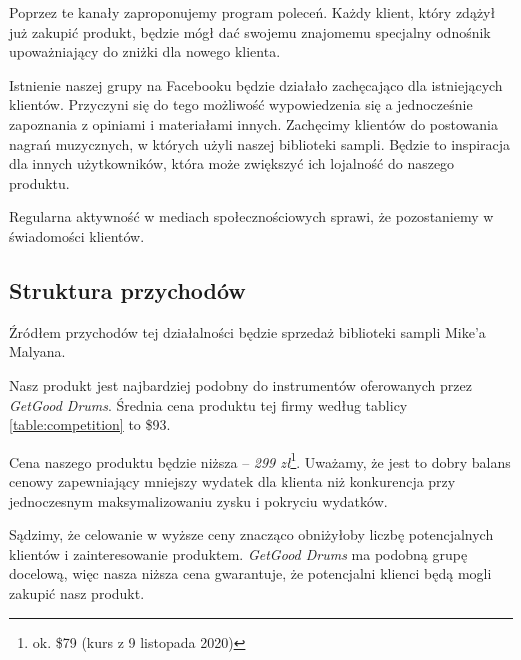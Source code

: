 \documentclass[12pt]{article}
\newcommand{\productpricezl}{299 zł\xspace}
\begin{document}
Poprzez te kanały zaproponujemy program poleceń.
Każdy klient, który zdążył już zakupić produkt, będzie mógł dać swojemu znajomemu specjalny odnośnik upoważniający do zniżki dla nowego klienta.

Istnienie naszej grupy na Facebooku będzie działało zachęcająco dla istniejących klientów.
Przyczyni się do tego możliwość wypowiedzenia się a jednocześnie zapoznania z opiniami i materiałami innych.
Zachęcimy klientów do postowania nagrań muzycznych, w których użyli naszej biblioteki sampli.
Będzie to inspiracja dla innych użytkowników, która może zwiększyć ich lojalność do naszego produktu.

Regularna aktywność w mediach społecznościowych sprawi, że pozostaniemy w świadomości klientów.

\subsection{Struktura przychodów}


Źródłem przychodów tej działalności będzie sprzedaż biblioteki sampli Mike'a Malyana.

Nasz produkt jest najbardziej podobny do instrumentów oferowanych przez \textit{GetGood Drums}.
Średnia cena produktu tej firmy według tablicy \ref{table:competition} to \$93.

Cena naszego produktu będzie niższa -- \emph{\productpricezl}\footnote{ok. \$79 (kurs z 9 listopada 2020)}.
Uważamy, że jest to dobry balans cenowy zapewniający mniejszy wydatek dla klienta niż konkurencja przy jednoczesnym maksymalizowaniu zysku i pokryciu wydatków.

Sądzimy, że celowanie w wyższe ceny znacząco obniżyłoby liczbę potencjalnych klientów i zainteresowanie produktem.
\textit{GetGood Drums} ma podobną grupę docelową, więc nasza niższa cena gwarantuje, że potencjalni klienci będą mogli zakupić nasz produkt.

\end{document}
